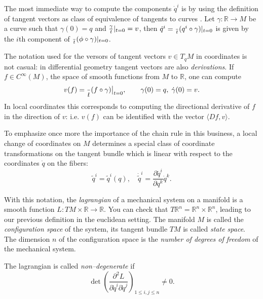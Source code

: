 \documentclass[english,fontsize=11pt,paper=a5,oneside]{scrbook}
\newcommand{\R}{\mathbb{R}}
\let\d\relax
\newcommand{\d}{\mathrm{d}}
\newcommand{\der}[2]{\frac{\d{#1}}{\d{#2}}}
\theoremstyle{definition}
\begin{document}
The most immediate way to compute the components $\dot q^i$ is by using the definition of tangent vectors as class of equivalence of tangents to curves \cite[Chapter 2.5]{lectures:aom:seri}.
Let $\gamma:\R \to M$ be a curve such that $\gamma(0) = q$ and $\der{\gamma}{t}|_{t=0} = v$, then $\dot q^i = \der{}{t}(q^i\circ\gamma)|_{t=0}$ is given by the $i$th component of $\der{}{t}(\phi\circ\gamma)|_{t=0}$.

The notation used for the versors of tangent vectors $v\in T_qM$ in coordinates is not casual: in differential geometry tangent vectors are also \emph{derivations}. If $f\in C^\infty(M)$, the space of smooth functions from $M$ to $\R$, one can compute
\begin{equation}
  v(f)=\der{}{t}(f\circ\gamma)\big|_{t=0}, \qquad \gamma(0) = q, \; \dot \gamma(0) = v.
\end{equation}
In local coordinates this corresponds to computing the directional derivative of $f$ in the direction of $v$: i.e. $v(f)$ can be identified with the vector $\langle Df,v\rangle$.

To emphasize once more the importance of the chain rule in this business, a local change of coordinates on $M$ determines a special class of coordinate transformations on the tangent bundle which is linear with respect to the coordinates $\dot q$ on the fibers:
\begin{equation}
  \widetilde q^i = \widetilde q^i (q), \quad \dot{\widetilde q}^i = \frac{\partial\widetilde q^i}{\partial q^k}\dot q^k.
\end{equation}

With this notation, the \emph{lagrangian} of a mechanical system on a manifold is a smooth function $L : TM\times\R \to \R$.
You can check that $T\R^n = \R^n \times \R^n$, leading to our previous definition in the euclidean setting.
The manifold $M$ is called the \emph{configuration space} of the system, its tangent bundle $TM$ is called \emph{state space}. The dimension $n$ of the configuration space is the \emph{number of degrees of freedom} of the mechanical system.

The lagrangian is called \emph{non--degenerate} if
\begin{equation}
  \det %
  \left(\frac{\partial^2 L}{\partial \dot{q}^i \partial \dot{q}^j}\right)_{1\leq i,j\leq n}
  \neq 0.
\end{equation}
\end{document}
